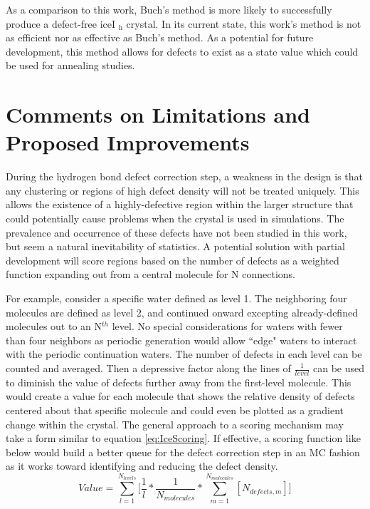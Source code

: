 As a comparison to this work, Buch's method is more likely to successfully produce a defect-free iceI $\mathrm{_{h}}$ crystal.
In its current state, this work's method is not as efficient nor as effective as Buch's method.
As a potential for future development, this method allows for defects to exist as a state value which could be used for annealing studies.



\section{Comments on Limitations and Proposed Improvements}

During the hydrogen bond defect correction step, a weakness in the design is that any clustering or regions of high defect density will not be treated uniquely.
This allows the existence of a highly-defective region within the larger structure that could potentially cause problems when the crystal is used in simulations. 
The prevalence and occurrence of these defects have not been studied in this work, but seem a natural inevitability of statistics. 
A potential solution with partial development will score regions based on the number of defects as a weighted function expanding out from a central molecule for N connections. 

For example, consider a specific water defined as level 1. 
The neighboring four molecules are defined as level 2, and continued onward excepting already-defined molecules out to an N$^{th}$ level. 
No special considerations for waters with fewer than four neighbors as periodic generation would allow ``edge" waters to interact with the periodic continuation waters.
The number of defects in each level can be counted and averaged.
Then a depressive factor along the lines of $\frac{1}{level}$ can be used to diminish the value of defects further away from the first-level molecule.
This would create a value for each molecule that shows the relative density of defects centered about that specific molecule and could even be plotted as a gradient change within the crystal.
The general approach to a scoring mechanism may take a form similar to equation \ref{eq:IceScoring}.
If effective, a scoring function like below would build a better queue for the defect correction step in an MC fashion as it works toward identifying and reducing the defect density.
\begin{equation}
\label{eq:IceScoring}
Value = \sum_{l=1}^{N_{levels}} \Big[\frac{1}{l} * \frac{1} {N_{molecules}} *\sum_{m=1}^{N_{molecules}}[N_{defects, m}]\Big]
\end{equation}






